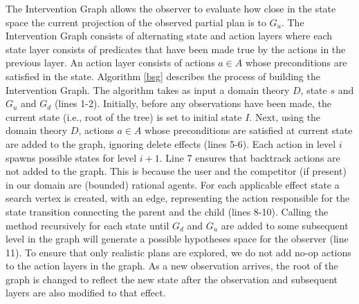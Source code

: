 \documentclass[letterpaper]{article}
\theoremstyle{plain}
\begin{document}
The Intervention Graph allows the observer to evaluate how close in the state space the current projection of the observed partial plan is to $G_u$. The Intervention Graph consists of alternating state and action layers where each state layer consists of predicates that have been made true by the actions in the previous layer. An action layer consists of actions $a\in A$ whose preconditions are satisfied in the state. Algorithm \ref{bsg} describes the process of building the Intervention Graph. The algorithm takes as input a domain theory $D$, state $s$ and $G_u$ and $G_d$ (lines 1-2). Initially, before any observations have been made, the current state (i.e., root of the tree) is set to initial state $I$. Next, using the domain theory $D$, actions  $a\in A$ whose preconditions are satisfied at current state are added to the graph, ignoring delete effects (lines 5-6). Each action in level $i$ spawns possible states for level $i+1$. Line 7 ensures that backtrack actions are not added to the graph. This is because the user and the competitor (if present) in our domain are (bounded) rational agents. For each applicable effect state a search vertex is created, with an edge, representing the action responsible for the state transition connecting the parent and the child (lines 8-10). Calling the method recursively for each state until $G_d$ and $G_u$ are added to some subsequent level in the graph will generate a possible hypotheses space for the observer (line 11). To ensure that only realistic plans are explored, we do not add no-op actions to the action layers in the graph. As a new observation arrives, the root of the graph is changed to reflect the new state after the observation and subsequent layers are also modified to that effect.  
\end{document}
